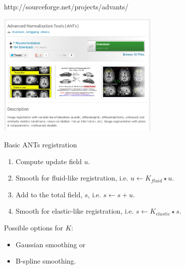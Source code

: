\documentclass[xcolor=dvipsnames,serif,10pt]{beamer}
\begin{document}



\begin{frame}{http://sourceforge.net/projects/advants/}
  \begin{center}
  \includegraphics[height=6cm]{ANTSSourceforge.png}
  \end{center}
\end{frame}


\begin{frame}{Basic ANTs registration}
  \begin{center}
    \begin{enumerate}
    \item Compute update field $u$.
    \item Smooth for fluid-like registration, i.e. $u \leftarrow K_{fluid} \star u$.
    \item Add to the total field, $s$, i.e. $s \leftarrow s + u$.
    \item Smooth for elastic-like registration, i.e. $s \leftarrow K_{elastic} \star s$.
    \end{enumerate}
  \end{center}

Possible options for $K$:
  \begin{center}
    \begin{itemize}
    \item Gaussian smoothing or
    \item B-spline smoothing.
    \end{itemize}
  \end{center}
\end{frame}
\end{document}
